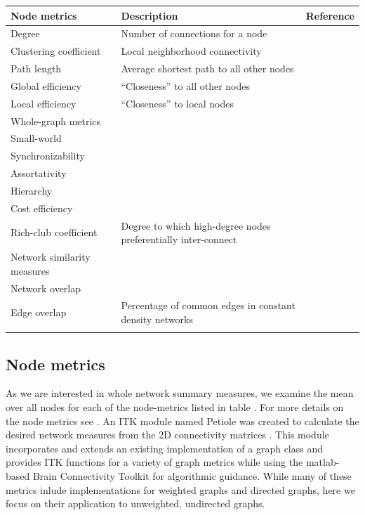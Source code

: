 \documentclass{frontiersSCNS} %
\begin{document}
\begin{table}[!t]
{\begin{tabular}{lll}
\midrule
Node metrics & Description & Reference\\\midrule
Degree & Number of connections for a node & \\
Clustering coefficient & Local neighborhood connectivity & \citep{Watts1998}\\
Path length & Average shortest path to all other nodes & \citep{Watts1998}\\
Global efficiency & ``Closeness'' to all other nodes & \citep{Latora2001}\\
Local efficiency & ``Closeness'' to local nodes & \\
\midrule
Whole-graph metrics\\
\midrule
Small-world & & \citep{Watts1998}\\
Synchronizability & & \citep{Motter2005}\\
Assortativity & & \citep{Newman2002}\\
Hierarchy & & \citep{Ravasz2003}\\
Cost efficiency & & \citep{Achard2007}\\
Rich-club coefficient & Degree to which high-degree nodes preferentially inter-connect & \citep{Colizza2006}\\
\midrule
Network similarity measures\\
\midrule
Network overlap & & \citep{vanWijk2010}\\
Edge overlap & Percentage of common edges in constant density networks & \citep{Weber2013} \\\botrule
\end{tabular}}{}
\end{table}

\subsection{Node metrics}
As we are interested in whole network summary measures, we examine the mean
over all nodes for each of the node-metrics listed in
table \label{tab:nodes}. For more details on the node metrics see
\citep{Rubinov2010}. An ITK module named Petiole was created to
calculate the desired network measures from the 2D connectivity
matrices \citep{Petiole}. This module incorporates and extends an existing implementation of a graph class \citep{NickITKJournal} and provides ITK functions for a variety of graph metrics while using the matlab-based Brain Connectivity Toolkit \citep{BCT} for algorithmic guidance. While many of these metrics inlude implementations for weighted graphs and directed graphs, here we focus on their application to unweighted, undirected graphs. 
\end{document}
